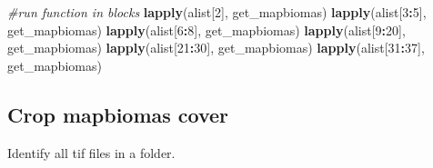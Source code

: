 \documentclass[
]{article}
\newenvironment{Shaded}{\begin{snugshade}}{\end{snugshade}}
\newcommand{\CommentTok}[1]{\textcolor[rgb]{0.56,0.35,0.01}{\textit{#1}}}
\newcommand{\DecValTok}[1]{\textcolor[rgb]{0.00,0.00,0.81}{#1}}
\newcommand{\FunctionTok}[1]{\textcolor[rgb]{0.13,0.29,0.53}{\textbf{#1}}}
\newcommand{\NormalTok}[1]{#1}
\newcommand{\SpecialCharTok}[1]{\textcolor[rgb]{0.81,0.36,0.00}{\textbf{#1}}}
\begin{document}
\begin{Shaded}
\begin{Highlighting}[]
\CommentTok{\#run function in blocks}
\FunctionTok{lapply}\NormalTok{(alist[}\DecValTok{2}\NormalTok{], get\_mapbiomas)}
\FunctionTok{lapply}\NormalTok{(alist[}\DecValTok{3}\SpecialCharTok{:}\DecValTok{5}\NormalTok{], get\_mapbiomas)}
\FunctionTok{lapply}\NormalTok{(alist[}\DecValTok{6}\SpecialCharTok{:}\DecValTok{8}\NormalTok{], get\_mapbiomas)}
\FunctionTok{lapply}\NormalTok{(alist[}\DecValTok{9}\SpecialCharTok{:}\DecValTok{20}\NormalTok{], get\_mapbiomas)}
\FunctionTok{lapply}\NormalTok{(alist[}\DecValTok{21}\SpecialCharTok{:}\DecValTok{30}\NormalTok{], get\_mapbiomas)}
\FunctionTok{lapply}\NormalTok{(alist[}\DecValTok{31}\SpecialCharTok{:}\DecValTok{37}\NormalTok{], get\_mapbiomas)}
\end{Highlighting}
\end{Shaded}

\hypertarget{crop-mapbiomas-cover}{%
\subsection{Crop mapbiomas cover}\label{crop-mapbiomas-cover}}

Identify all tif files in a folder.
\end{document}
